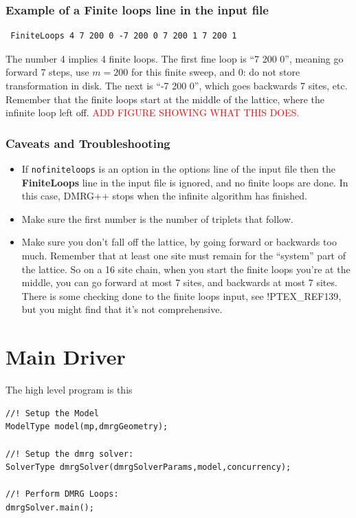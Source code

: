 \documentclass[paper=letter]{scrartcl}
\newcommand{\todo}[1]{\textcolor{red}{#1}}
\begin{document}
\subsubsection{Example of a Finite loops line in the input file} \begin{verbatim} FiniteLoops 4 7 200 0 -7 200 0 7 200 1 7 200 1 \end{verbatim} The number 4 implies 4 finite loops. The first fine loop is ``7 200 0'', meaning go forward 7 steps, use $m=200$ for this finite sweep, and 0: do not store transformation in disk. The next is ``-7 200 0'', which goes backwards 7 sites, etc. Remember that the finite loops start at the middle of the lattice, where the infinite loop left off. \todo{ADD FIGURE SHOWING WHAT THIS DOES.}

\subsubsection{Caveats and Troubleshooting} \begin{itemize} \item If \verb=nofiniteloops= is an option in the options line of the input file then the {\bf FiniteLoops} line in the input file is ignored, and no finite loops are done. In this case, DMRG++ stops when the infinite algorithm has finished.

\item Make sure the first number is the number of triplets that follow. \item Make sure you don't fall off the lattice, by going forward or backwards too much. Remember that at least one site must remain for the ``system'' part of the lattice. So on a 16 site chain, when you start the finite loops you're at the middle, you can go forward at most 7 sites, and backwards at most 7 sites.  There is some checking done to the finite loops input, see !PTEX\_REF{139}, but you might find that it's not comprehensive. \end{itemize}

\section{Main Driver}
The high level program is this
\begin{lstlisting}
//! Setup the Model
ModelType model(mp,dmrgGeometry);

//! Setup the dmrg solver:
SolverType dmrgSolver(dmrgSolverParams,model,concurrency);

//! Perform DMRG Loops:
dmrgSolver.main();
\end{lstlisting}
\end{document}
